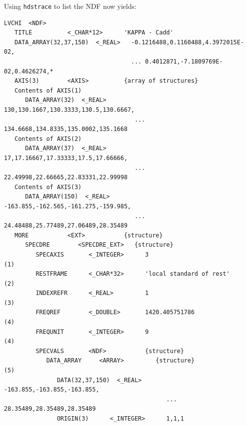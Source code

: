 \documentclass[11pt,twoside]{article}
\begin{document}
Using {\tt hdstrace} to list the NDF now yields:

\small
\begin{verbatim}
LVCHI  <NDF>
   TITLE          <_CHAR*12>      'KAPPA - Cadd'
   DATA_ARRAY(32,37,150)  <_REAL>   -0.1216488,0.1160488,4.3972015E-02,
                                    ... 0.4012871,-7.1809769E-02,0.4626274,*
   AXIS(3)        <AXIS>          {array of structures}
   Contents of AXIS(1)
      DATA_ARRAY(32)  <_REAL>        130,130.1667,130.3333,130.5,130.6667,
                                     ... 134.6668,134.8335,135.0002,135.1668
   Contents of AXIS(2)
      DATA_ARRAY(37)  <_REAL>        17,17.16667,17.33333,17.5,17.66666,
                                     ... 22.49998,22.66665,22.83331,22.99998
   Contents of AXIS(3)
      DATA_ARRAY(150)  <_REAL>       -163.855,-162.565,-161.275,-159.985,
                                     ... 24.48488,25.77489,27.06489,28.35489
   MORE           <EXT>           {structure}
      SPECDRE        <SPECDRE_EXT>   {structure}
         SPECAXIS       <_INTEGER>      3                                   (1)
         RESTFRAME      <_CHAR*32>      'local standard of rest'            (2)
         INDEXREFR      <_REAL>         1                                   (3)
         FREQREF        <_DOUBLE>       1420.405751786                      (4)
         FREQUNIT       <_INTEGER>      9                                   (4)
         SPECVALS       <NDF>           {structure}
            DATA_ARRAY     <ARRAY>         {structure}                      (5)
               DATA(32,37,150)  <_REAL>       -163.855,-163.855,-163.855,
                                              ... 28.35489,28.35489,28.35489
               ORIGIN(3)      <_INTEGER>      1,1,1


\end{verbatim}
\end{document}

